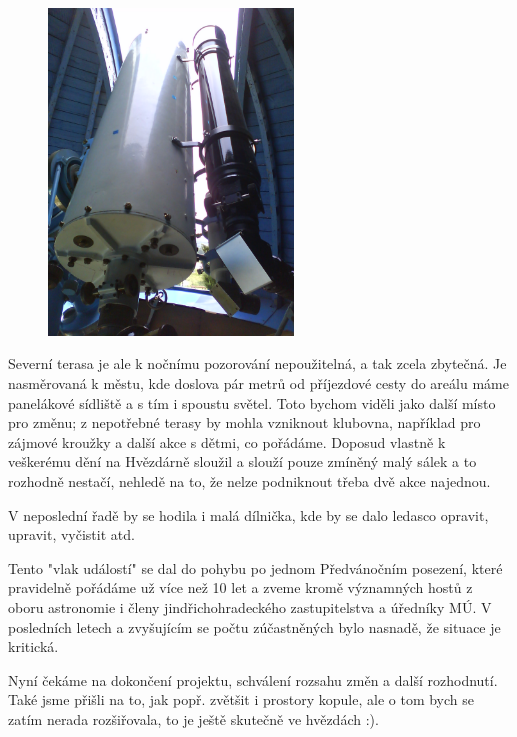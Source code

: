 \documentclass[10pt,a5paper,twoside]{book}
\begin{document}
\begin{figure}
  \begin{center}
    \includegraphics[width=0.58\textwidth]{starasestava.JPG}
  \end{center}
\end{figure}

Severní terasa je ale k nočnímu pozorování nepoužitelná, a tak zcela zbytečná. Je nasměrovaná k městu, kde doslova pár metrů od příjezdové cesty do areálu máme panelákové sídliště a s tím i spoustu světel. Toto bychom viděli jako další místo pro změnu; z nepotřebné terasy by mohla vzniknout klubovna, například pro zájmové kroužky a další akce s dětmi, co pořádáme. Doposud vlastně k veškerému dění na Hvězdárně sloužil a slouží pouze zmíněný malý sálek a to rozhodně nestačí, nehledě na to, že nelze podniknout třeba dvě akce najednou.  

V neposlední řadě by se hodila i malá dílnička, kde by se dalo ledasco opravit, upravit, vyčistit atd. 

Tento "vlak událostí" se dal do pohybu po jednom Předvánočním posezení, které pravidelně pořádáme už více než 10 let a zveme kromě významných hostů z oboru astronomie i členy jindřichohradeckého zastupitelstva a úředníky MÚ. V posledních letech a zvyšujícím se počtu zúčastněných bylo nasnadě, že situace je kritická.

Nyní čekáme na dokončení projektu, schválení rozsahu změn a další rozhodnutí. Také jsme přišli na to, jak popř. zvětšit i prostory kopule, ale o tom bych se zatím nerada rozšiřovala, to je ještě skutečně ve hvězdách :).
\end{document}
